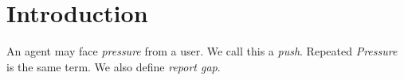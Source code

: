 \section{Introduction}
An agent may face \emph{pressure} from a user. We call this a \textit{push}.
Repeated \emph{Pressure} is the same term. We also define \emph{report gap}.

